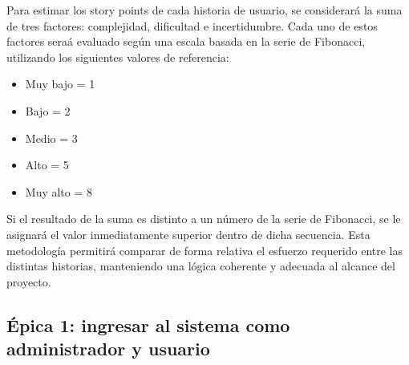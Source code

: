\documentclass[
11pt, %
]{charter}
\begin{document}
Para estimar los story points de cada historia de usuario, se considerará la suma de tres factores: complejidad, dificultad e incertidumbre. Cada uno de estos factores seraá evaluado según una escala basada en la serie de Fibonacci, utilizando los siguientes valores de referencia:

\begin{itemize}
	\item Muy bajo = 1
	\item Bajo = 2
	\item Medio = 3
	\item Alto = 5
	\item Muy alto = 8

\end{itemize}

Si el resultado de la suma es distinto a un número de la serie de Fibonacci, se le asignará el valor inmediatamente superior dentro de dicha secuencia. Esta metodología permitirá comparar de forma relativa el esfuerzo requerido entre las distintas historias, manteniendo una lógica coherente y adecuada al alcance del proyecto.

\subsection*{Épica 1: ingresar al sistema como administrador y usuario}
\end{document}
